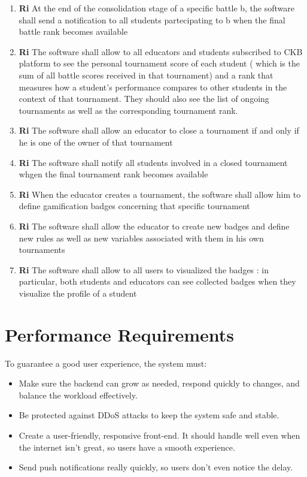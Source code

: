 \begin{enumerate}
        \item \textbf{Ri} \quad At the end of the consolidation stage of a specific battle b, the software shall send a notification to all students partecipating to b when the final battle rank becomes available
        \item \textbf{Ri} \quad The software shall allow to all educators and students subscribed to CKB platform to see the personal tournament score of each student ( which is the sum of all battle scores received in that tournament) and a rank that measures how a student's performance compares to other students in the context of that tournament. They should also see the list of ongoing tournaments as well as the corresponding tournament rank.  
        \item \textbf{Ri} \quad The software shall allow an educator to close a tournament if and only if he is one of the owner of that tournament
        \item \textbf{Ri} \quad The software shall notify all students involved in a closed tournament whgen the final tournament rank becomes available
        \item \textbf{Ri} \quad When the educator creates a tournament, the software shall allow him to define gamification badges concerning that specific tournament 
        \item \textbf{Ri} \quad The software shall allow the educator to create new badges and define new rules as well as new variables associated with them in his own tournaments
        \item \textbf{Ri} \quad The software shall allow to all users to visualized the badges : in particular, both students and educators can see collected badges when they visualize the profile of a student
    
    \end{enumerate}

\section{Performance Requirements}
To guarantee a good user experience, the system must:

\begin{itemize}
    \item Make sure the backend can grow as needed, respond quickly to changes, and balance the workload effectively.
    \item Be protected against DDoS attacks to keep the system safe and stable.
    \item Create a user-friendly, responsive front-end. It should handle well even when the internet isn't great, so users have a smooth experience.
    \item Send push notifications really quickly, so users don't even notice the delay.
\end{itemize}

